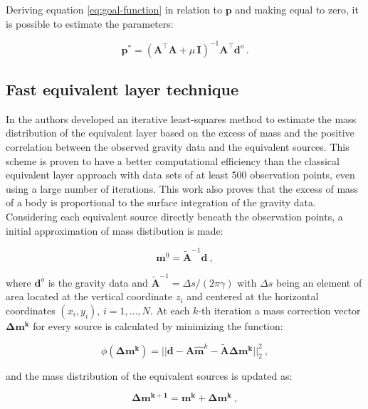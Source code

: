 \documentclass[paper]{geophysics}
\begin{document}
Deriving equation \ref{eq:goal-function} in relation to $\mathbf{p}$ and making equal to zero, it is possible to estimate the parameters:

\begin{equation}
\mathbf{p}^{\ast} = \left( \mathbf{A}^{\top}\mathbf{A} + 
\mu \, \mathbf{I} \right)^{-1}
\mathbf{A}^{\top} \mathbf{d}^{o} \,.
\label{eq:p-ast-parameter-space}
\end{equation}

\subsection{Fast equivalent layer technique}
In \cite{siqueira2017fast} the authors developed an iterative least-squares method to estimate the mass distribution of the equivalent layer based on the excess of mass and the positive correlation between the observed gravity data and the equivalent sources. This scheme is proven to have a better computational efficiency than the classical equivalent layer approach with data sets of at least 500 observation points, even using a large number of iterations.
This work also proves that the excess of mass of a body is proportional to the surface integration of the gravity data. Considering each equivalent source directly beneath the observation points, a initial approximation of mass distibution is made:

\begin{equation}
\mathbf{m}^0 = \tilde{\mathbf{A}}^{-1} \mathbf{d} \: ,
\label{eq:initial_m}
\end{equation}

where $\mathbf{d}^o$ is the gravity data and $\tilde{\mathbf{A}}^{-1} = \Delta s/(2 \pi \gamma)$ with $\Delta s$ being an element of area located at the vertical coordinate $z_i$ and centered at the horizontal coordinates $(x_i,y_i), \, i = 1,..., N$. At each $k$-th iteration a mass correction vector $\mathbf{\Delta m^k}$ for every source is calculated by minimizing the function:

\begin{equation}
\phi(\mathbf{\Delta m^k}) = ||\mathbf{d} - \mathbf{A}\hat{\mathbf{m}}^k - \tilde{\mathbf{A}}\mathbf{\Delta m^k}||_2^2 \: ,
\label{eq:goal-function_fast}
\end{equation}

and the mass distribution of the equivalent sources is updated as:

\begin{equation}
\mathbf{\Delta m^{k+1}} = \mathbf{m^{k}} + \mathbf{\Delta m^{k}} \: ,
\label{eq:update_m}
\end{equation}
\end{document}
